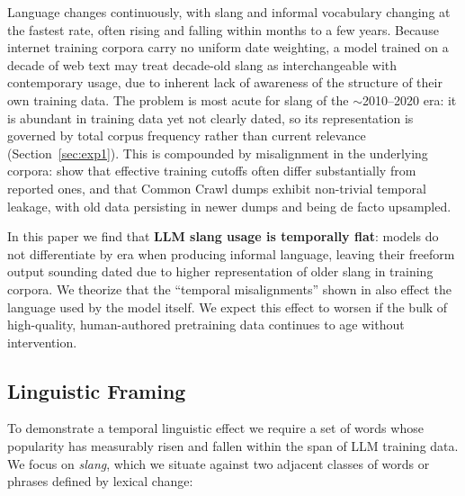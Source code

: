 \documentclass[11pt]{article}
\begin{document}
Language changes continuously, with slang and informal vocabulary changing at the fastest rate, often rising and falling within months to a few years. Because internet training corpora carry no uniform date weighting, a model trained on a decade of web text may treat decade-old slang as interchangeable with contemporary usage, due to inherent lack of awareness of the structure of their own training data. The problem is most acute for slang of the $\sim$2010--2020 era: it is abundant in training data yet not clearly dated, so its representation is governed by total corpus frequency rather than current relevance (Section~\ref{sec:exp1}). This is compounded by misalignment in the underlying corpora: \citet{cheng2024dated} show that effective training cutoffs often differ substantially from reported ones, and that Common Crawl dumps exhibit non-trivial temporal leakage, with old data persisting in newer dumps and being de facto upsampled.

In this paper we find that \textbf{LLM slang usage is temporally flat}: models do not differentiate by era when producing informal language, leaving their freeform output sounding dated due to higher representation of older slang in training corpora. We theorize that the ``temporal misalignments'' shown in \citep{cheng2024dated} also effect the language used by the model itself. We expect this effect to worsen if the bulk of high-quality, human-authored pretraining data continues to age without intervention.

\subsection{Linguistic Framing}

To demonstrate a temporal linguistic effect we require a set of words whose popularity has measurably risen and fallen within the span of LLM training data. We focus on \textit{slang}, which we situate against two adjacent classes of words or phrases defined by lexical change:
\end{document}
